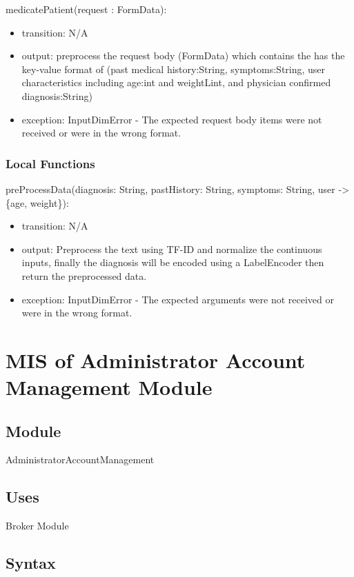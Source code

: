 \documentclass[12pt, titlepage]{article}
\begin{document}
\noindent medicatePatient(request : FormData):
\begin{itemize}
\item transition: N/A
\item output: preprocess the request body (FormData) which contains the has the key-value format of (past medical history:String, symptoms:String, user characteristics including age:int and weightLint, and physician confirmed diagnosis:String)
\item exception: InputDimError - The expected request body items were not received or were in the wrong format.
\end{itemize}

\subsubsection{Local Functions}

\noindent preProcessData(diagnosis: String, pastHistory: String, symptoms: String, user -> \{age, weight\}):
\begin{itemize}
\item transition: N/A
\item output: Preprocess the text using TF-ID and normalize the continuous inputs, finally the diagnosis will be encoded using a LabelEncoder then return the preprocessed data.
\item exception: InputDimError - The expected arguments were not received or were in the wrong format.
\end{itemize}

\newpage

\section{MIS of Administrator Account Management Module} \label{Module_AdminAccount}

\subsection{Module}
AdministratorAccountManagement

\subsection{Uses}
Broker Module\\

\subsection{Syntax}
\end{document}

